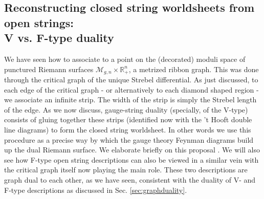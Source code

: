 \documentclass[english]{article}
\let\mc=\mathcal
\let\mb=\mathbb
\begin{document}









\subsection{Reconstructing closed string worldsheets from open strings: \\ V vs. F-type duality}\label{sec:VFconstr}

We have seen how to associate to a point on the (decorated) moduli space of punctured Riemann surfaces $\mc{M}_{g,n}\times{\mathbb R}^n_+$, a metrized ribbon graph. This was done through the critical graph of the unique Strebel differential. As just discussed, to each edge of the critical graph - or alternatively to each diamond shaped region - we associate an infinite strip. The width of the strip is simply the Strebel length of the edge. As we now discuss, gauge-string duality (specially, of the V-type) consists of gluing together these strips (identified now with the 't Hooft double line diagrams) to form the closed string worldsheet. In other words we use this procedure as a precise way by which the gauge theory Feynman diagrams build up the dual Riemann surface. We elaborate briefly on this proposal \cite{freefieldsadsII, freefieldsIII, Joburg}. We will also see how F-type open string descriptions can also be viewed in a similar vein with the critical graph itself now playing the main role. These two descriptions are graph dual to each other, as we have seen, consistent with the duality  of V- and F-type descriptions as discussed in Sec. \ref{sec:graphduality}.   
\end{document}
